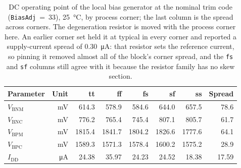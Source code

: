 \begin{table}[htbp]
  \centering
  \caption[{DC operating point of the local bias generator at the nominal trim code, by process corner.}]{DC operating point of the local bias generator at the nominal trim code (\texttt{BiasAdj}~=~33), \SI{25}{\celsius}, by process corner; the last column is the spread across corners. The degeneration resistor is moved with the process corner here. An earlier corner set held it at typical in every corner and reported a supply-current spread of \SI{0.30}{\micro\ampere}: that resistor sets the reference current, so pinning it removed almost all of the block's corner spread, and the \texttt{fs} and \texttt{sf} columns still agree with it because the resistor family has no skew section.}
  \label{tab:biasgen-dcop}
  \begin{tabular}{lrrrrrrr}
    \toprule
    Parameter & Unit & tt & ff & fs & sf & ss & Spread \\
    \midrule
    $V_{\mathrm{BNM}}$ & \si{\milli\volt} & 614.3 & 578.9 & 584.6 & 644.0 & 657.5 & 78.6 \\
    $V_{\mathrm{BNC}}$ & \si{\milli\volt} & 776.2 & 765.4 & 745.4 & 807.1 & 805.7 & 61.7 \\
    $V_{\mathrm{BPM}}$ & \si{\milli\volt} & 1815.4 & 1841.7 & 1804.2 & 1826.6 & 1777.6 & 64.1 \\
    $V_{\mathrm{BPC}}$ & \si{\milli\volt} & 1589.3 & 1571.3 & 1578.4 & 1600.2 & 1575.2 & 28.9 \\
    $I_{\mathrm{DD}}$ & \si{\micro\ampere} & 24.38 & 35.97 & 24.23 & 24.52 & 18.38 & 17.59 \\
    \bottomrule
  \end{tabular}
\end{table}

